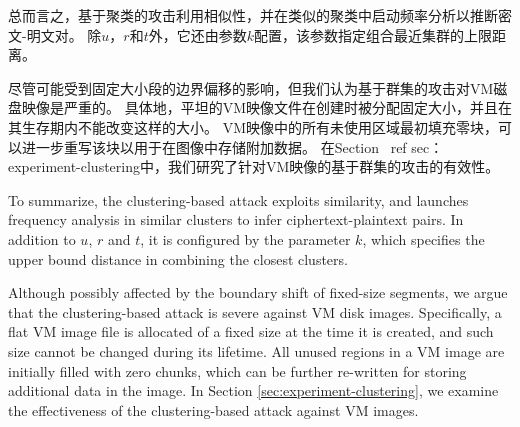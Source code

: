 总而言之，基于聚类的攻击利用相似性，并在类似的聚类中启动频率分析以推断密文-明文对。 除$u$，$r$和$t$外，它还由参数$k$配置，该参数指定组合最近集群的上限距离。

尽管可能受到固定大小段的边界偏移的影响，但我们认为基于群集的攻击对VM磁盘映像是严重的。 具体地，平坦的VM映像文件在创建时被分配固定大小，并且在其生存期内不能改变这样的大小。 VM映像中的所有未使用区域最初填充零块，可以进一步重写该块以用于在图像中存储附加数据。 在Section \ ref {sec：experiment-clustering}中，我们研究了针对VM映像的基于群集的攻击的有效性。

To summarize, the clustering-based attack exploits similarity, and launches frequency analysis in similar clusters to infer ciphertext-plaintext pairs. In addition to  $u$, $r$ and $t$, it is configured by the parameter $k$, which specifies the upper bound distance in combining the closest clusters.   

Although possibly affected by the boundary shift of fixed-size segments, we argue that the clustering-based attack is severe against VM disk images. Specifically, a flat VM image file is allocated of a fixed size at the time it is created, and such size cannot be changed during its lifetime. All unused regions in a VM image are initially filled with  zero chunks, which can be further re-written for storing additional data in the image. In Section \ref{sec:experiment-clustering}, we examine the effectiveness of the clustering-based attack against VM images.


